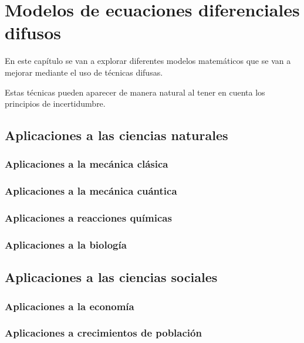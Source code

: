 
\chapter{Modelos de ecuaciones diferenciales difusos}
En este capítulo se van a explorar diferentes modelos matemáticos que se van a mejorar mediante el uso de técnicas difusas.

Estas técnicas pueden aparecer de manera natural al tener en cuenta los principios de incertidumbre.
\section{Aplicaciones a las ciencias naturales}

\subsection{Aplicaciones a la mecánica clásica}
\subsection{Aplicaciones a la mecánica cuántica}
\subsection{Aplicaciones a reacciones químicas}
\subsection{Aplicaciones a la biología}

\section{Aplicaciones a las ciencias sociales}

\subsection{Aplicaciones a la economía}

\subsection{Aplicaciones a crecimientos de población}